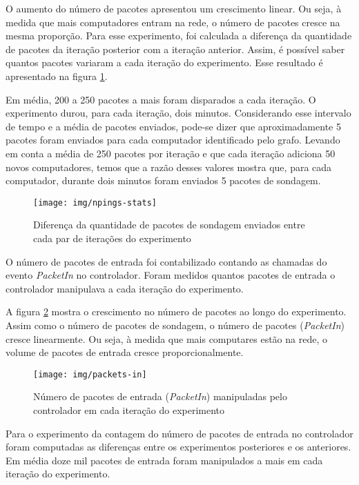 O aumento do número de pacotes apresentou um crescimento linear.
Ou seja, à medida que mais computadores entram na rede, o número de pacotes
cresce na mesma proporção.
Para esse experimento, foi calculada a diferença da quantidade de pacotes da
iteração posterior com a iteração anterior.
Assim, é possível saber quantos pacotes variaram a cada iteração do 
experimento.
Esse resultado é apresentado na figura \ref{fig:npings-stats}. 

Em média, 200 a 250 pacotes a mais foram disparados a cada iteração. 
O experimento durou, para cada iteração, dois minutos. 
Considerando esse intervalo de tempo e a média de pacotes enviados, pode-se 
dizer que aproximadamente 5 pacotes foram enviados para cada computador 
identificado pelo grafo.
Levando em conta a média de 250 pacotes por iteração e que cada iteração 
adiciona 50 novos computadores, temos que a razão desses valores mostra 
que, para cada computador, durante dois minutos foram enviados 5 pacotes 
de sondagem.

\begin{figure}[!htb]
    \centering
    \label{fig:npings-stats}
    \texttt{[image: img/npings-stats]}
    \caption{Diferença da quantidade de pacotes de sondagem enviados entre 
    cada par de iterações do experimento}
\end{figure}

O número de pacotes de entrada foi contabilizado contando as chamadas do 
evento \emph{PacketIn} no controlador.
Foram medidos quantos pacotes de entrada o controlador manipulava a cada 
iteração do experimento.

A figura \ref{fig:packets-in} mostra o crescimento no número de pacotes ao 
longo do experimento. 
Assim como o número de pacotes de sondagem, o número de pacotes 
(\emph{PacketIn}) cresce linearmente.
Ou seja, à medida que mais computares estão na rede, o volume de pacotes de 
entrada cresce proporcionalmente.

\begin{figure}[!htb]
    \centering
    \label{fig:packets-in}
    \texttt{[image: img/packets-in]}
    \caption{Número de pacotes de entrada (\emph{PacketIn}) manipuladas pelo
    controlador em cada iteração do experimento}
\end{figure}


Para o experimento da contagem do número de pacotes de entrada no controlador
foram computadas as diferenças entre os experimentos posteriores e os
anteriores.
Em média doze mil pacotes de entrada foram manipulados a mais em cada 
iteração do experimento.


